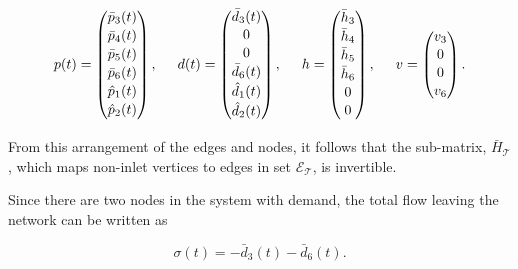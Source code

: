 \begin{equation}
\label{example1_signals_constants}
p(t) =
 \begin{pmatrix} 
 \bar{p}_3(t) \\[1.3pt] 
 \bar{p}_4(t) \\[1.3pt]
 \bar{p}_5(t) \\[1.3pt] 
 \bar{p}_6(t) \\[1.3pt] 
 \hat{p}_1(t) \\[1.3pt] 
 \hat{p}_2(t) \\[1.3pt] 
 \end{pmatrix}
 , \hspace{5mm}
 d(t) =  \begin{pmatrix} 
 \bar{d}_3(t) \\[1pt] 
 0 \\[1pt]
 0 \\[1pt] 
 \bar{d}_6(t) \\[1pt] 
 \hat{d}_1(t) \\[1pt] 
 \hat{d}_2(t) \\[1pt] 
 \end{pmatrix}
 , \hspace{5mm}
 h =  \begin{pmatrix} 
 \bar{h}_3 \\[1pt] 
 \bar{h}_4 \\[1pt]
 \bar{h}_5 \\[1pt] 
 \bar{h}_6 \\[1pt] 
 0 \\[1pt] 
 0 \\[1pt] 
 \end{pmatrix}
 , \hspace{5mm}
 v =  \begin{pmatrix} 
 v_3 \\[1pt] 
 0 \\[1pt]
 0 \\[1pt] 
 v_6 \\[1pt]
 \end{pmatrix}.
\end{equation}

From this arrangement of the edges and nodes, it follows that the sub-matrix, $\bar{H}_{\mathcal{T}}$, which maps non-inlet vertices to edges in set $\mathcal{E}_{\mathcal{T}}$, is invertible. 

Since there are two nodes in the system with demand, the total flow leaving the network can be written as

\begin{equation}
  \label{consumption1}
  \sigma(t) = -\bar{d}_3(t) - \bar{d}_6(t).
\end{equation}

